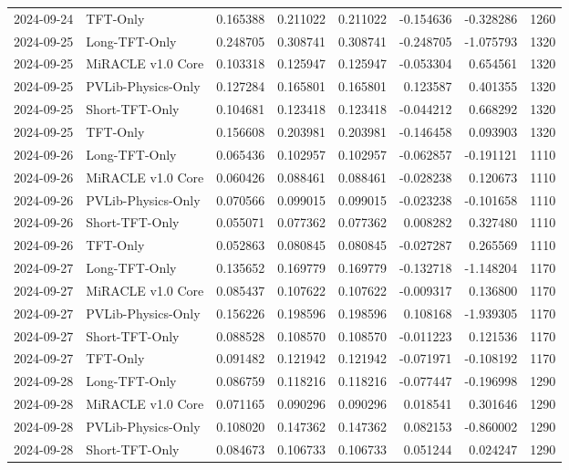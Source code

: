 \begin{tabular}{llrrrrrr}
2024-09-24 & TFT-Only & 0.165388 & 0.211022 & 0.211022 & -0.154636 & -0.328286 & 1260 \\
2024-09-25 & Long-TFT-Only & 0.248705 & 0.308741 & 0.308741 & -0.248705 & -1.075793 & 1320 \\
2024-09-25 & MiRACLE v1.0 Core & 0.103318 & 0.125947 & 0.125947 & -0.053304 & 0.654561 & 1320 \\
2024-09-25 & PVLib-Physics-Only & 0.127284 & 0.165801 & 0.165801 & 0.123587 & 0.401355 & 1320 \\
2024-09-25 & Short-TFT-Only & 0.104681 & 0.123418 & 0.123418 & -0.044212 & 0.668292 & 1320 \\
2024-09-25 & TFT-Only & 0.156608 & 0.203981 & 0.203981 & -0.146458 & 0.093903 & 1320 \\
2024-09-26 & Long-TFT-Only & 0.065436 & 0.102957 & 0.102957 & -0.062857 & -0.191121 & 1110 \\
2024-09-26 & MiRACLE v1.0 Core & 0.060426 & 0.088461 & 0.088461 & -0.028238 & 0.120673 & 1110 \\
2024-09-26 & PVLib-Physics-Only & 0.070566 & 0.099015 & 0.099015 & -0.023238 & -0.101658 & 1110 \\
2024-09-26 & Short-TFT-Only & 0.055071 & 0.077362 & 0.077362 & 0.008282 & 0.327480 & 1110 \\
2024-09-26 & TFT-Only & 0.052863 & 0.080845 & 0.080845 & -0.027287 & 0.265569 & 1110 \\
2024-09-27 & Long-TFT-Only & 0.135652 & 0.169779 & 0.169779 & -0.132718 & -1.148204 & 1170 \\
2024-09-27 & MiRACLE v1.0 Core & 0.085437 & 0.107622 & 0.107622 & -0.009317 & 0.136800 & 1170 \\
2024-09-27 & PVLib-Physics-Only & 0.156226 & 0.198596 & 0.198596 & 0.108168 & -1.939305 & 1170 \\
2024-09-27 & Short-TFT-Only & 0.088528 & 0.108570 & 0.108570 & -0.011223 & 0.121536 & 1170 \\
2024-09-27 & TFT-Only & 0.091482 & 0.121942 & 0.121942 & -0.071971 & -0.108192 & 1170 \\
2024-09-28 & Long-TFT-Only & 0.086759 & 0.118216 & 0.118216 & -0.077447 & -0.196998 & 1290 \\
2024-09-28 & MiRACLE v1.0 Core & 0.071165 & 0.090296 & 0.090296 & 0.018541 & 0.301646 & 1290 \\
2024-09-28 & PVLib-Physics-Only & 0.108020 & 0.147362 & 0.147362 & 0.082153 & -0.860002 & 1290 \\
2024-09-28 & Short-TFT-Only & 0.084673 & 0.106733 & 0.106733 & 0.051244 & 0.024247 & 1290 \\

\end{tabular}
